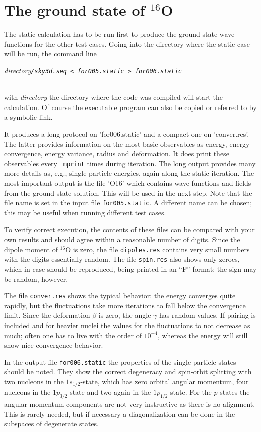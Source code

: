 \documentclass[A4]{elsarticle}
\begin{document}
\section{The ground state of $^{16}$O}
The static calculation has to be run first to produce the ground-state
wave functions for the other test cases.
Going into the directory where the static case will be run, the command
line\\
\centerline{\em directory\tt/sky3d.seq < for005.static > for006.static  }
\\
with {\em directory} the directory where the code was compiled will
start the calculation. Of course the executable program can also be
copied or referred to by a symbolic link.

It produces a long protocol on 'for006.static' and a compact
one on 'conver.res'. The latter provides information on the most
basic observables as energy, energy convergence, energy variance,
radius and deformation. It does print these observables every {\tt
  mprint} times during iteration. The long output provides many more
details as, e.g., single-particle energies, again along the static
iteration. The most important output is the file 'O16' which
contains wave functions and fields from the ground state solution. This
will be used in the next step.  Note that the file name is set in the
input file {\tt for005.static}. A different name can be chosen; this
may be useful when running different test cases.

To verify correct execution, the contents of these files can be
compared with your own results and should agree within a reasonable
number of digits. Since the dipole moment of  $^{16}$O is zero, the
file {\tt dipoles.res} contains very small numbers with the digits
essentially random. The file {\tt spin.res} also shows only zeroes,
which in case should be reproduced, being printed in an ``F'' format;
the sign may be random, however.

The file {\tt conver.res} shows the typical behavior: the energy
converges quite rapidly, but the fluctuations take more iterations to
fall below the convergence limit. Since the deformation $\beta$ is
zero, the angle $\gamma$ has random values. If pairing is included and
for heavier nuclei the values for the fluctuations to not decrease as
much; often one has to live with the order of $10^{-4}$, whereas the
energy will still show nice convergence behavior.

In the output file {\tt for006.static} the properties of the
single-particle states should be noted. They show the correct
degeneracy and spin-orbit splitting with two nucleons in the
$1s_{1/2}$-state, which has zero orbital angular momentum, four
nucleons in the $1p_{3/2}$-state and two again in the
$1p_{1/2}$-state. For the $p$-states the angular momentum components
are not very instructive as there is no alignment. This is rarely
needed, but if necessary a diagonalization can be done in the
subspaces of degenerate states.
\end{document}
